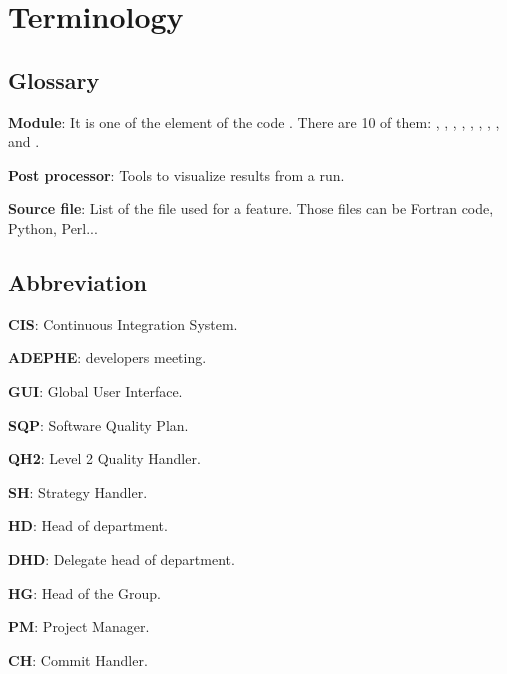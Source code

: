 \chapter{Terminology}

\section{Glossary}

\textbf{Module}: It is one of the element of the code \telemacsystem. There are 10 of them:
, , \tomawac, \artemis, \sisyphe, \postel, \bief, \stbtel, \estel
and \mascaret.

\textbf{Post processor}: Tools to visualize results from a \telemacsystem run.

\textbf{Source file}: List of the file used for a feature. Those files can be
Fortran code, Python, Perl...

\section{Abbreviation}

\textbf{CIS}: Continuous Integration System.

\textbf{ADEPHE}: \telemacsystem developers meeting.

\textbf{GUI}: Global User Interface.

\textbf{SQP}: Software Quality Plan.

\textbf{QH2}: Level 2 Quality Handler.

\textbf{SH}: Strategy Handler.

\textbf{HD}: Head of department.

\textbf{DHD}: Delegate head of department.

\textbf{HG}: Head of the Group.

\textbf{PM}: Project Manager.

\textbf{CH}: Commit Handler.

